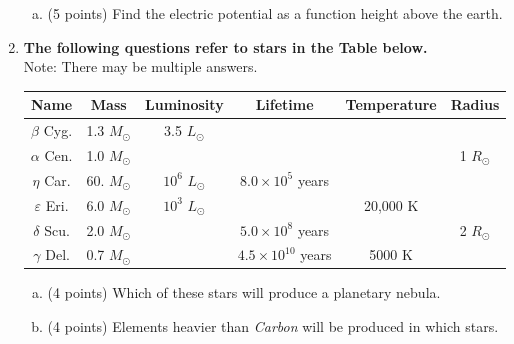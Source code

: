 \documentclass[12pt, a4paper]{article}
\begin{document}
\begin{enumerate}
\begin{enumerate}[(a)]
			\item (5 points) Find the electric potential as a function height above the earth.
		\end{enumerate}
		\item \textbf{The following questions refer to stars in the Table below.}\\
		Note: There may be multiple answers.\\
		\begin{tabular}{|c|c|c|c|c|c|}
			\hline
			       Name        &     Mass      &    Luminosity    &          Lifetime          & Temperature &   Radius    \\ \hline
			   $\beta$ Cyg.    & 1.3 $M_\odot$ &  3.5 $L_\odot$   &                            &             &             \\ \hline
			  $\alpha$ Cen.    & 1.0 $M_\odot$ &                  &                            &             & 1 $R_\odot$ \\ \hline
			   $\eta$ Car.     & 60. $M_\odot$ & $10^6$ $L_\odot$ &  $8.0 \times 10^5$ years   &             &             \\ \hline
			$\varepsilon$ Eri. & 6.0 $M_\odot$ & $10^3$ $L_\odot$ &                            &  20,000 K   &             \\ \hline
			  $\delta$ Scu.    & 2.0 $M_\odot$ &                  &  $5.0 \times 10^8$ years   &             & 2 $R_\odot$ \\ \hline
			  $\gamma$ Del.    & 0.7 $M_\odot$ &                  & $4.5 \times 10^{10}$ years &   5000 K    &             \\ \hline
		\end{tabular}
		\begin{enumerate}[(a)]
			\item (4 points) Which of these stars will produce a planetary nebula.
			\item (4 points) Elements heavier than \textit{Carbon} will be produced in which stars.
		\end{enumerate}
	\end{enumerate}
\end{document}
